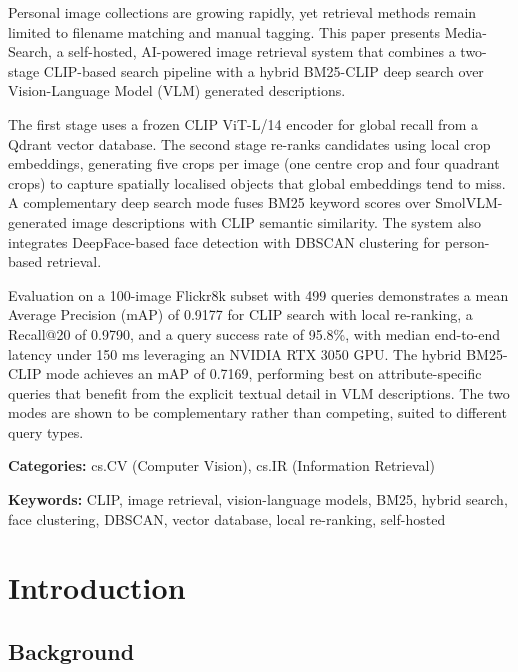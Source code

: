 \documentclass[12pt,a4paper,oneside]{report}
\begin{document}
Personal image collections are growing rapidly, yet retrieval methods remain limited to filename matching and manual tagging. This paper presents Media-Search, a self-hosted, AI-powered image retrieval system that combines a two-stage CLIP-based search pipeline with a hybrid BM25-CLIP deep search over Vision-Language Model (VLM) generated descriptions.

The first stage uses a frozen CLIP ViT-L/14 encoder for global recall from a Qdrant vector database. The second stage re-ranks candidates using local crop embeddings, generating five crops per image (one centre crop and four quadrant crops) to capture spatially localised objects that global embeddings tend to miss. A complementary deep search mode fuses BM25 keyword scores over SmolVLM-generated image descriptions with CLIP semantic similarity. The system also integrates DeepFace-based face detection with DBSCAN clustering for person-based retrieval.

Evaluation on a 100-image Flickr8k subset with 499 queries demonstrates a mean Average Precision (mAP) of 0.9177 for CLIP search with local re-ranking, a Recall@20 of 0.9790, and a query success rate of 95.8\%, with median end-to-end latency under 150 ms leveraging an NVIDIA RTX 3050 GPU. The hybrid BM25-CLIP mode achieves an mAP of 0.7169, performing best on attribute-specific queries that benefit from the explicit textual detail in VLM descriptions. The two modes are shown to be complementary rather than competing, suited to different query types.

\textbf{Categories:} cs.CV (Computer Vision), cs.IR (Information Retrieval)

\textbf{Keywords:} CLIP, image retrieval, vision-language models, BM25, hybrid search, face clustering, DBSCAN, vector database, local re-ranking, self-hosted

\clearpage
\tableofcontents

\chapter{Introduction}

\section{Background}
\end{document}
